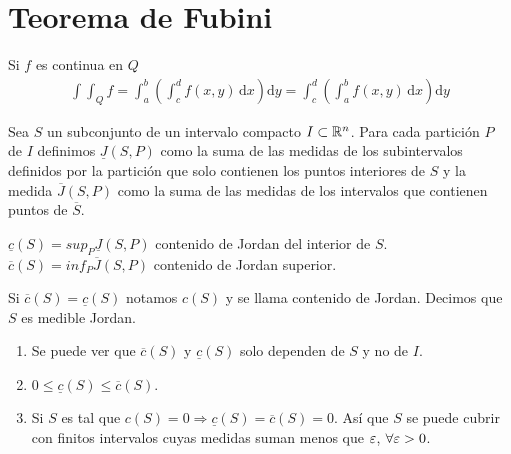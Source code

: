 \section{Teorema de Fubini}
\begin{corollary}[Fubini]
  Si $f$ es continua en $Q$ \begin{align*}
    \int\int_Q f = \int_a^b(\int_c^d f(x, y) \, \mathrm{d}x) \mathrm{d}y = \int_c^d(\int_a^b f(x, y)\, \mathrm{d}x)\mathrm{d}y
  \end{align*}
\end{corollary}

\begin{definition}
  Sea $S$ un subconjunto de un intervalo compacto $I \subset \mathbb{R}^n$. Para cada partición $P$ de $I$ definimos $\underline{J}(S, P)$ como la suma de las medidas de los subintervalos definidos por la partición que solo contienen los puntos interiores de $S$ y la medida $\overline{J}(S, P)$ como la suma de las medidas de los intervalos que contienen puntos de $\overline{S}$.
\end{definition}

\begin{definition}
  $\underline{c}(S) = sup_P \underline{J}(S, P)$ contenido de Jordan del interior de $S$.
  $\overline{c}(S) = inf_P \overline{J}(S, P)$ contenido de Jordan superior.
\end{definition}

\clearpage

\begin{definition}
  Si $\overline{c}(S) = \underline{c}(S)$ notamos $c(S)$ y se llama contenido de Jordan. Decimos que $S$ es medible Jordan.
\end{definition}

\begin{note}
  \begin{enumerate}
    \item Se puede ver que $\overline{c}(S)$ y $\underline{c}(S)$ solo dependen de $S$ y no de $I$.
    \item $0 \leq \underline{c}(S) \leq \overline{c}(S)$.
    \item Si $S$ es tal que $c(S) = 0 \Rightarrow \underline{c}(S) = \overline{c}(S) = 0$. Así que $S$ se puede cubrir con finitos intervalos cuyas medidas suman menos que $\varepsilon$, $\forall \varepsilon > 0$.
  \end{enumerate}
\end{note}
